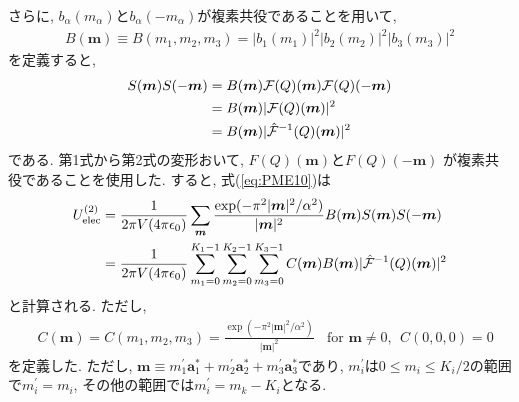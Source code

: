 さらに, $b_{\alpha}(m_{\alpha})$と$b_{\alpha}(-m_{\alpha})$が複素共役であることを用いて, 
\begin{align}
   B(\bm{m})
 \equiv
   B(m_{1}, m_{2}, m_{3})
 =
   |b_{1}(m_{1})|^{2} |b_{2}(m_{2})|^{2} |b_{3}(m_{3})|^{2}
 \label{eq:PME21}
\end{align}
を定義すると,
\begin{align}
   S(\bm{m})S(-\bm{m})
&=
   B(\bm{m}) \mathcal{F}(Q)(\bm{m}) \mathcal{F}(Q)(-\bm{m})
 \notag \\
&=
   B(\bm{m}) |\mathcal{F}(Q)(\bm{m})|^{2}
 \notag \\
&=
   B(\bm{m}) |\hat{\mathcal{F}}^{-1}(Q)(\bm{m})|^{2}
 \notag
\end{align}
である.
第1式から第2式の変形おいて, $F(Q)(\bm{m})$と$F(Q)(-\bm{m})$
が複素共役であることを使用した.
すると, 式(\ref{eq:PME10})は
\begin{align}
   U_{\mathrm{elec}}^{(2)}
 &=
   \frac{1}{2 \pi V (4 \pi \epsilon_{0})} \sum_{\bm{m}}
   \frac {\exp( - \pi^{2}|\bm{m}|^{2} / \alpha^{2} ) }{|\bm{m}|^{2}}
   B(\bm{m}) S(\bm{m})S(-\bm{m})
 \notag
 \\
 &=
    \frac{1}{2 \pi V (4 \pi \epsilon_{0})}
    \sum_{m_{1}=0}^{K_{1}-1} \sum_{m_{2}=0}^{K_{2}-1} \sum_{m_{3}=0}^{K_{3}-1}
    C(\bm{m}) B(\bm{m})
    | \hat{\mathcal{F}}^{-1}(Q) (\bm{m}) |^{2}
 \label{eq:PME22}
\end{align}
と計算される. ただし,
\begin{align}
  &C(\bm{m})
 = C(m_{1}, m_{2}, m_{3})
= \frac {\exp( - \pi^{2}|\bm{m}|^{2} / \alpha^{2} ) }{|\bm{m}|^{2}}
 ~~~~\textrm{for $\bm{m} \neq 0$}, ~~C(0,0,0) = 0
 \label{eq:PME11}
\end{align}
を定義した. ただし,
$\bm{m} \equiv m_{1}^{\prime}\bm{a}_{1}^{*} + m_{2}^{\prime} \bm{a}_{2}^{*}+ m_{3}^{\prime}\bm{a}_{3}^{*}$であり, $m_{i}^{\prime}$は$0 \le m_{i} \le K_{i}/2$の範囲で$m_{i}^{\prime} = m_{i}$, その他の範囲では$m_{i}^{\prime} = m_{k} - K_{i}$となる.

